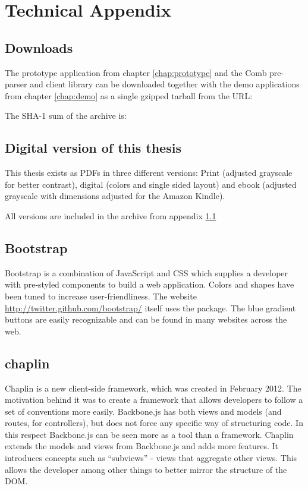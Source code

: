 \documentclass[thesis.tex]{subfiles}
\begin{document}
\chapter{Technical Appendix}

\section{Downloads}
\label{app:downloads}
The prototype application from chapter \ref{chap:prototype} and the Comb
pre-parser and client library can be downloaded together with
the demo applications from chapter \ref{chap:demo} as a single gzipped tarball
from the URL: \url{}

The SHA-1 sum of the archive is: \inline{}


\section{Digital version of this thesis}
This thesis exists as PDFs in three different versions:
Print (adjusted grayscale for better contrast),
digital (colors and single sided layout) and
ebook (adjusted grayscale with dimensions adjusted for the Amazon Kindle).

All versions are included in the archive from appendix \ref{app:downloads}

\section{Bootstrap}
\label{app:bootstrap}
Bootstrap is a combination of JavaScript and CSS which supplies a developer
with pre-styled components to build a web application. Colors and shapes
have been tuned to increase user-friendliness.
The website \url{http://twitter.github.com/bootstrap/} itself uses the package.
The blue gradient buttons are easily recognizable and can be found in many
websites across the web.

\section{chaplin}
\label{app:chaplin}

Chaplin is a new client-side framework, which was created in February 2012.
The motivation behind it was to create a framework that allows developers to
follow a set of conventions more easily. Backbone.js has both views and models
(and routes, for controllers), but does not force any specific way of
structuring code. In this respect Backbone.js can be seen more as a tool than a
framework.
Chaplin extends the models and views from Backbone.js and adds more features.
It introduces concepts such as ``subviews'' - views that aggregate other views.
This allows the developer among other things to better mirror the structure of
the DOM.
\end{document}
